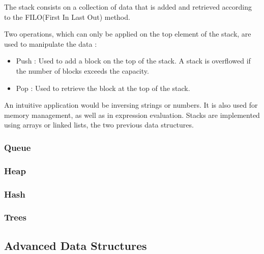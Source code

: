 \documentclass[10pt,landscape,twocolumn]{article}
\begin{document}
The stack consists on a collection of data that is added and retrieved according to the FILO(First In Last Out) method.

Two operations, which can only be applied on the top element of the stack, are used to manipulate the data :
\begin{itemize}
	\item Push : Used to add a block on the top of the stack. A stack is overflowed if the number of blocks exceeds the capacity.  
	\item Pop : Used to retrieve the block at the top of the stack.
\end{itemize}

\begin{center}
\end{center}

An intuitive application would be inversing strings or numbers. It is also used for memory management, as well as in expression evaluation. Stacks are implemented using arrays or linked lists, the two previous data structures.

\subsubsection{Queue}


\subsubsection{Heap}
\subsubsection{Hash}
\subsubsection{Trees}

\subsection{Advanced Data Structures}
\end{document}
